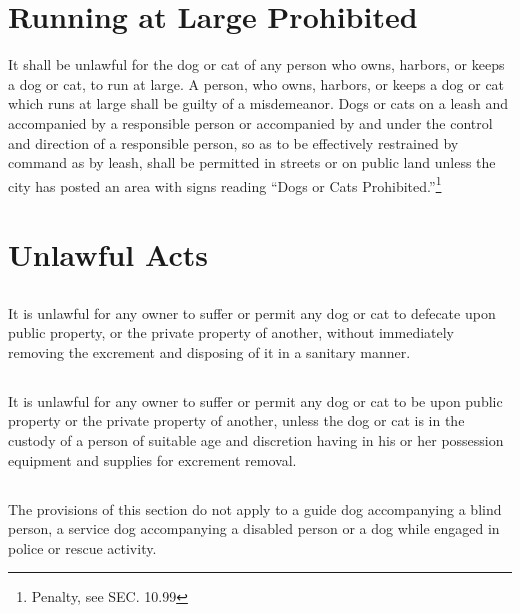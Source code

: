 \section{Running at Large Prohibited}
It shall be unlawful for the dog or cat of any person who owns, harbors, or keeps a dog or cat, to run at large.  A person, who owns, harbors, or keeps a dog or cat which runs at large shall be guilty of a misdemeanor.  Dogs or cats on a leash and accompanied by a responsible person or accompanied by and under the control and direction of a responsible person, so as to be effectively restrained by command as by leash, shall be permitted in streets or on public land unless the city has posted an area with signs reading “Dogs or Cats Prohibited.”\footnote{Penalty, see SEC. 10.99}

\section{Unlawful Acts}
\subsection{}
It is unlawful for any owner to suffer or permit any dog or cat to defecate upon public property, or the private property of another, without immediately removing the excrement and disposing of it in a sanitary manner.
\subsection{}
It is unlawful for any owner to suffer or permit any dog or cat to be upon public property or the private property of another, unless the dog or cat is in the custody of a person of suitable age and discretion having in his or her possession equipment and supplies for excrement removal.
\subsection{}
The provisions of this section do not apply to a guide dog accompanying a blind person, a service dog accompanying a disabled person or a dog while engaged in police or rescue activity.
